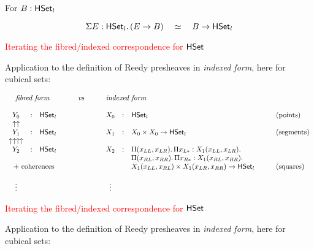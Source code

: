 \documentclass[12pt,landscape]{article}
\begin{document}
\begin{LARGE}
\begin{sf}
\bigskip
\bigskip
\bigskip
For $B:\mathsf{HSet}_l$

$$\Sigma E:\mathsf{HSet}_l.\, (E \rightarrow B) ~~~\simeq~~~ B \rightarrow \mathsf{HSet}_l$$

\newpage

\begin{center}
\textcolor{red}{\huge Iterating the fibred/indexed correspondence for $\mathsf{HSet}$}
\end{center}

\bigskip
\bigskip

Application to the definition of Reedy presheaves in \emph{indexed form}, here for cubical sets:

$$
\begin{array}{cllccllll}
\multicolumn{3}{c}{\mbox{\emph{fibred form}}} & \qquad\mathit{vs}\qquad & \multicolumn{3}{l}{\mbox{\emph{indexed form}}} \\
\\
Y_0 &:& \HSet_l & & X_0 & : & \HSet_l & \mbox{(points)}\\
\uparrow\uparrow \\
Y_1 &:& \HSet_l & & X_1 & : & X_0 \times X_0 \rightarrow \HSet_l & \mbox{(segments)}\\
\uparrow\uparrow\uparrow\uparrow \\
Y_2 &:& \HSet_l & & X_2 & : & \Pi (x_{LL},x_{LR}).\, \Pi x_{L*}:X_1 (x_{LL},x_{LR}).\\
& & & & & & \Pi (x_{RL},x_{RR}).\, \Pi x_{R*}:X_1 (x_{RL},x_{RR}).\, \\
\multicolumn{3}{c}{\mbox{~+ coherences}} & & & & X_1 (x_{LL},x_{RL}) \times X_1 (x_{LR},x_{RR}) \rightarrow \HSet_l \qquad & \mbox{(squares)}\\
\\
\vdots & & & & \vdots\\
\end{array}
$$

\newpage

\begin{center}
\textcolor{red}{\huge Iterating the fibred/indexed correspondence for $\mathsf{HSet}$}
\end{center}

\bigskip
\bigskip

Application to the definition of Reedy presheaves in \emph{indexed form}, here for cubical sets:


\end{sf}
\end{LARGE}
\end{document}
